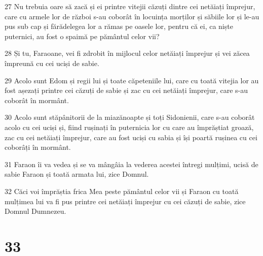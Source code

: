 \par 27 Nu trebuia oare să zacă și ei printre vitejii căzuți dintre cei netăiați împrejur, care cu armele lor de război s-au coborât în locuința morților și săbiile lor și le-au pus sub cap și fărădelegea lor a rămas pe oasele lor, pentru că ei, ca niște puternici, au fost o spaimă pe pământul celor vii?
\par 28 Și tu, Faraoane, vei fi zdrobit în mijlocul celor netăiați împrejur și vei zăcea împreună cu cei uciși de sabie.
\par 29 Acolo sunt Edom și regii lui și toate căpeteniile lui, care cu toată vitejia lor au fost așezați printre cei căzuți de sabie și zac cu cei netăiați împrejur, care s-au coborât în mormânt.
\par 30 Acolo sunt stăpânitorii de la miazănoapte și toți Sidonienii, care s-au coborât acolo cu cei uciși și, fiind rușinați în puternicia lor cu care au împrăștiat groază, zac cu cei netăiați împrejur, care au fost uciși cu sabia și își poartă rușinea cu cei coborâți în mormânt.
\par 31 Faraon îi va vedea și se va mângâia la vederea acestei întregi mulțimi, ucisă de sabie Faraon și toată armata lui, zice Domnul.
\par 32 Căci voi împrăștia frica Mea peste pământul celor vii și Faraon cu toată mulțimea lui va fi pus printre cei netăiați împrejur cu cei căzuți de sabie, zice Domnul Dumnezeu.

\chapter{33}

